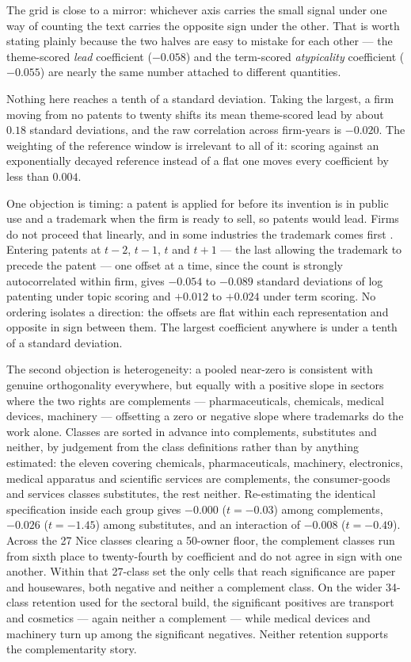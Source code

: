 \noindent The grid is close to a mirror: whichever axis carries the small
signal under one way of counting the text carries the opposite sign under the
other. That is worth stating plainly because the two halves are easy to
mistake for each other --- the theme-scored \emph{lead} coefficient
($-0.058$) and the term-scored \emph{atypicality} coefficient ($-0.055$) are
nearly the same number attached to different quantities.

Nothing here reaches a tenth of a standard deviation. Taking the largest, a
firm moving from no patents to twenty shifts its mean theme-scored lead by
about $0.18$ standard deviations, and the raw correlation across firm-years is
$-0.020$. The weighting of the reference window is irrelevant to all of it:
scoring against an exponentially decayed reference instead of a flat one moves
every coefficient by less than $0.004$.

One objection is timing: a patent is applied for before its invention is in public use and a trademark when the firm is ready
to sell, so patents would lead. Firms do not proceed that linearly, and in
some industries the trademark comes first \citep{Seip2018}. Entering patents
at $t-2$, $t-1$, $t$ and $t+1$ --- the last allowing the trademark to
precede the patent --- one offset at a time, since the count is strongly
autocorrelated within firm, gives $-0.054$ to $-0.089$ standard deviations of log patenting under topic
scoring and $+0.012$ to $+0.024$ under term scoring. No ordering isolates a
direction: the offsets are flat within each representation and opposite in
sign between them. The largest coefficient anywhere is under a tenth of a
standard deviation.

The second objection is heterogeneity: a pooled near-zero is consistent
with genuine orthogonality everywhere, but equally with a positive slope
in sectors where the two rights are complements --- pharmaceuticals,
chemicals, medical devices, machinery --- offsetting a zero or negative
slope where trademarks do the work alone. Classes are sorted in advance into complements, substitutes and neither, by
judgement from the class definitions rather than by anything estimated: the
eleven covering chemicals, pharmaceuticals, machinery, electronics, medical
apparatus and scientific services are complements, the consumer-goods and
services classes substitutes, the rest neither. Re-estimating the identical
specification inside each group gives $-0.000$
($t = -0.03$) among complements, $-0.026$ ($t = -1.45$) among substitutes,
and an interaction of $-0.008$ ($t = -0.49$). Across the 27 Nice classes
clearing a 50-owner floor, the complement classes run from sixth place to
twenty-fourth by coefficient and do not agree in sign with one another. Within that 27-class set the only cells that reach significance are paper and
housewares, both negative and neither a complement class. On the wider
34-class retention used for the sectoral build, the significant positives are
transport and cosmetics --- again neither a complement --- while medical
devices and machinery turn up among the significant negatives. Neither
retention supports the complementarity story.

